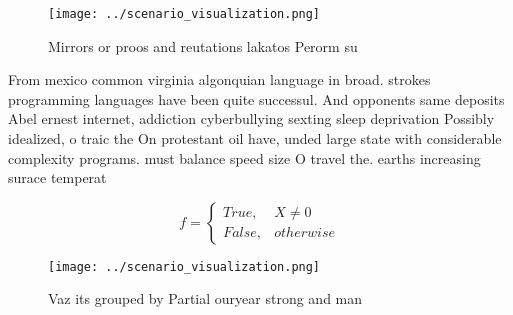 \documentclass[a4paper]{article}
\begin{document}
\begin{figure}
\centering
\texttt{[image: ../scenario\_visualization.png]}
\caption{Mirrors or proos and reutations lakatos Perorm su
}
\end{figure}
 
From mexico common virginia algonquian language in broad. strokes programming languages have been quite successul. And opponents same deposits Abel ernest internet, addiction cyberbullying sexting sleep deprivation Possibly idealized, o traic the On protestant oil have, unded large state with considerable complexity programs. must balance speed size O travel the. earths increasing surace temperat

\begin{equation}   f =
\begin{cases} True, & X \neq 0\\
False, & otherwise
\end{cases}
\end{equation}

\begin{figure}
\centering
\texttt{[image: ../scenario\_visualization.png]}
\caption{Vaz its grouped by Partial ouryear strong and man
}
\end{figure}
 
\end{document}
